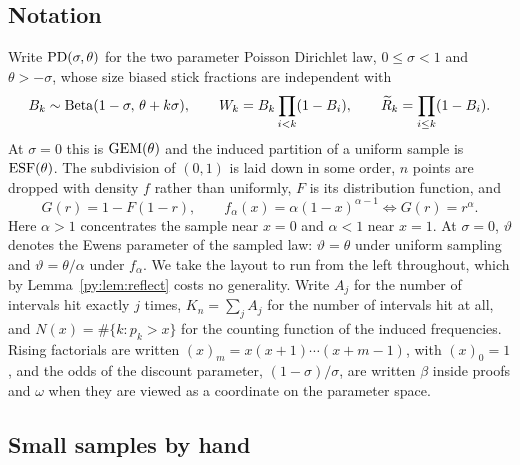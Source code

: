 \subsection{Notation}

Write $\mathrm{PD}(\sigma,\theta)$ for the two parameter Poisson Dirichlet law, $0 \le \sigma < 1$ and
$\theta > -\sigma$, whose size biased stick fractions are independent with
\begin{equation}
B_k \sim \mathrm{Beta}(1-\sigma,\, \theta + k\sigma),
\qquad
W_k = B_k \prod_{i<k}(1-B_i),
\qquad
\widetilde R_k = \prod_{i \le k}(1-B_i).
\label{py:eq:pysticks}
\end{equation}
At $\sigma = 0$ this is $\mathrm{GEM}(\theta)$ and the induced partition of a uniform sample is
$\mathrm{ESF}(\theta)$. The subdivision of $(0,1)$ is laid down in some order, $n$ points are dropped with
density $f$ rather than uniformly, $F$ is its distribution function, and
\begin{equation}
G(r) = 1 - F(1-r),
\qquad
f_\alpha(x) = \alpha(1-x)^{\alpha-1} \iff G(r) = r^{\alpha}.
\label{py:eq:G}
\end{equation}
Here $\alpha > 1$ concentrates the sample near $x = 0$ and $\alpha < 1$ near $x = 1$. At $\sigma = 0$,
$\vartheta$ denotes the Ewens parameter of the sampled law: $\vartheta = \theta$ under uniform
sampling and $\vartheta = \theta/\alpha$ under $f_\alpha$. We take the
layout to run from the left throughout, which by Lemma~\ref{py:lem:reflect} costs no generality. Write $A_j$
for the number of intervals hit exactly $j$ times, $K_n = \sum_j A_j$ for the number of intervals
hit at all, and $N(x) = \#\{k : p_k > x\}$ for the counting function of the induced frequencies.
Rising factorials are written $(x)_m = x(x+1)\cdots(x+m-1)$, with $(x)_0 = 1$, and the odds of the
discount parameter, $(1-\sigma)/\sigma$, are written $\beta$ inside proofs and $\omega$ when they
are viewed as a coordinate on the parameter space.

\subsection{Small samples by hand}
\label{py:sec:small}

